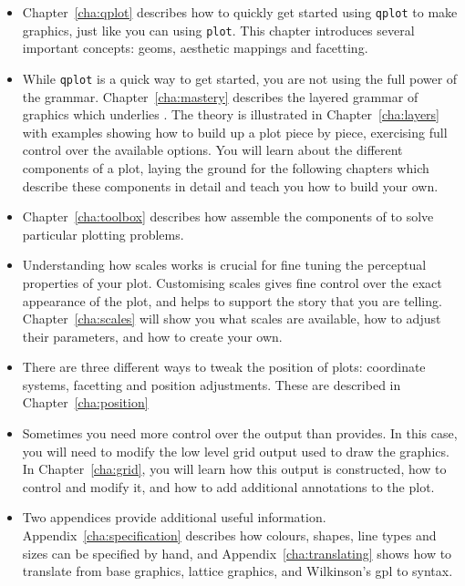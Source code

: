 \begin{itemize}
  \item Chapter~\ref{cha:qplot} describes how to quickly get started using {\tt qplot} to make graphics, just like you can using {\tt plot}.  This chapter introduces several important \ggplot concepts: geoms, aesthetic mappings and facetting.
  
  \item While {\tt qplot} is a quick way to get started, you are not using the full power of the grammar.  Chapter~\ref{cha:mastery} describes the layered grammar of graphics which underlies \ggplot.  The theory is illustrated in Chapter~\ref{cha:layers} with examples showing how to build up a plot piece by piece, exercising full control over the available options.  You will learn about the different components of a plot, laying the ground for the following chapters which describe these components in detail and teach you how to build your own. 

  \item Chapter~\ref{cha:toolbox} describes how assemble the components of \ggplot to solve particular plotting problems.

  \item Understanding how scales works is crucial for fine tuning the perceptual properties of your plot.  Customising scales gives fine control over the exact appearance of the plot, and helps to support the story that you are telling.  Chapter~\ref{cha:scales} will show you what scales are available, how to adjust their parameters, and how to create your own.

  \item There are three different ways to tweak the position of plots: coordinate systems, facetting and position adjustments.  These are described in Chapter~\ref{cha:position}
  
  
  \item Sometimes you need more control over the output than \ggplot provides.  In this case, you will need to modify the low level grid output used to draw the graphics.  In Chapter~\ref{cha:grid}, you will learn how this output is constructed, how to control and modify it, and how to add additional annotations to the plot.

  \item Two appendices provide additional useful information.  Appendix~\ref{cha:specification} describes how colours, shapes, line types and sizes can be specified by hand, and Appendix~\ref{cha:translating} shows how to translate from base graphics, lattice graphics, and Wilkinson's {\sc gpl} to \ggplot syntax.

\end{itemize}


